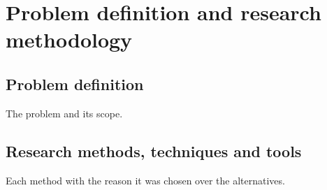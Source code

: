 \chapter{Problem definition and research methodology}

\section{Problem definition}
The problem and its scope.

\section{Research methods, techniques and tools}
Each method with the reason it was chosen over the alternatives.
